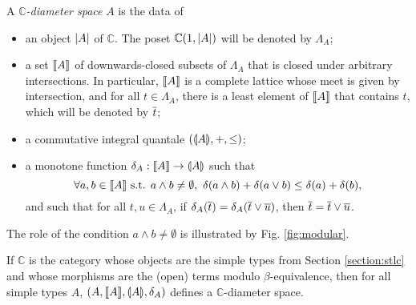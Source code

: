 \begin{definition} A \emph{$\mathbb{C}$-diameter space} $A$ is the data of \begin{itemize}
\item an object $\left\vert A\right\vert$ of $\mathbb{C}$. The poset $\mathbb{C}(1,\left\vert A\right\vert)$ will be denoted by $\Lambda_A$;
\item a set $\llbracket A \rrbracket$ of downwards-closed subsets of $\Lambda_A$ that is closed under arbitrary intersections. In particular, $\llbracket A \rrbracket$ is a complete lattice whose meet is given by intersection, and for all $t\in\Lambda_A$, there is a least element of $\llbracket A \rrbracket$ that contains $t$, which will be denoted by $\overline{t}$;
\item a commutative integral quantale $(\llparenthesis A \rrparenthesis, +, \leq)$;
\item a monotone function $\delta_A : \llbracket A \rrbracket \to \llparenthesis A \rrparenthesis$ such that $$\forall a,b \in \llbracket A \rrbracket \text{ s.t. } a \wedge b \neq \emptyset,~ \delta(a \wedge b) + \delta(a \vee b) \leq \delta(a) + \delta(b)\text{,}$$
and such that for all $t,u \in \Lambda_A$, if $\delta_A(\overline{t}) = \delta_A(\overline{t} \vee \overline{u})$, then $\overline{t} = \overline{t} \vee \overline{u}$.
\end{itemize}
\end{definition}

The role of the condition $a \wedge b \neq \emptyset$ is illustrated by Fig. \ref{fig:modular}.

\begin{example} If $\mathbb{C}$ is the category whose objects are the simple types from Section \ref{section:stlc} and whose morphisms are the (open) terms modulo $\beta$-equivalence, then for all simple types $A$, $(A, \llbracket A \rrbracket, \llparenthesis A \rrparenthesis, \delta_A)$ defines a $\mathbb{C}$-diameter space.
\end{example}

